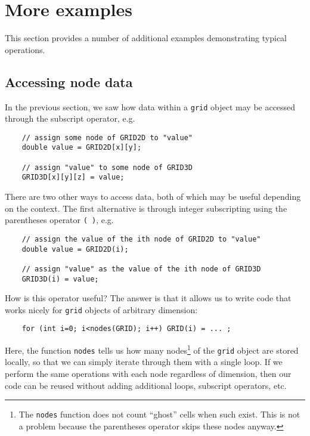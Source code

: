 \section{More examples}
This section provides a number of additional examples demonstrating typical \MMSP operations.

\subsection{Accessing node data}
In the previous section, we saw how data within a {\tt grid} object may be accessed through the subscript operator, e.g.
\begin{shadebox}
\begin{verbatim}
    // assign some node of GRID2D to "value"
    double value = GRID2D[x][y];

    // assign "value" to some node of GRID3D 
    GRID3D[x][y][z] = value;
\end{verbatim}
\end{shadebox}
There are two other ways to access data, both of which may be useful depending on the context.  The first alternative is through integer subscripting using the parentheses operator {\tt ( )}, e.g.
\begin{shadebox}
\begin{verbatim}
    // assign the value of the ith node of GRID2D to "value"
    double value = GRID2D(i);

    // assign "value" as the value of the ith node of GRID3D
    GRID3D(i) = value;
\end{verbatim}
\end{shadebox}
How is this operator useful?  The answer is that it allows us to write code that works nicely for {\tt grid} objects of arbitrary dimension:
\begin{shadebox}
\begin{verbatim}
    for (int i=0; i<nodes(GRID); i++) GRID(i) = ... ;
\end{verbatim}
\end{shadebox}
Here, the function {\tt nodes} tells us how many nodes\footnote{The {\tt nodes} function does not count ``ghost'' cells when such exist.  This is not a problem because the parentheses operator skips these nodes anyway.} of the {\tt grid} object are stored locally, so that we can simply iterate through them with a single loop.  If we perform the same operations with each node regardless of dimension, then our code can be reused without adding additional loops, subscript operators, etc.

